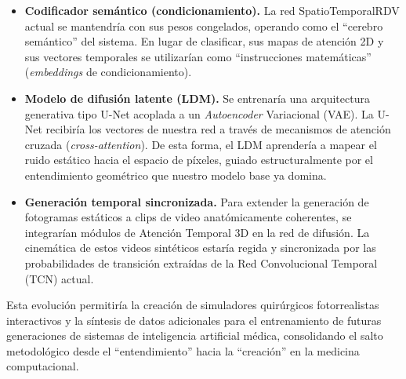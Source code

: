 \documentclass[11pt]{article}
\begin{document}
\begin{itemize}[leftmargin=1.4em]
    \item \textbf{Codificador semántico (condicionamiento).} La red SpatioTemporalRDV actual se mantendría con sus pesos congelados, operando como el ``cerebro semántico'' del sistema. En lugar de clasificar, sus mapas de atención 2D y sus vectores temporales se utilizarían como ``instrucciones matemáticas'' (\emph{embeddings} de condicionamiento).
    \item \textbf{Modelo de difusión latente (LDM).} Se entrenaría una arquitectura generativa tipo U-Net acoplada a un \emph{Autoencoder} Variacional (VAE). La U-Net recibiría los vectores de nuestra red a través de mecanismos de atención cruzada (\emph{cross-attention}). De esta forma, el LDM aprendería a mapear el ruido estático hacia el espacio de píxeles, guiado estructuralmente por el entendimiento geométrico que nuestro modelo base ya domina.
    \item \textbf{Generación temporal sincronizada.} Para extender la generación de fotogramas estáticos a clips de video anatómicamente coherentes, se integrarían módulos de Atención Temporal 3D en la red de difusión. La cinemática de estos videos sintéticos estaría regida y sincronizada por las probabilidades de transición extraídas de la Red Convolucional Temporal (TCN) actual.
\end{itemize}

Esta evolución permitiría la creación de simuladores quirúrgicos fotorrealistas interactivos y la síntesis de datos adicionales para el entrenamiento de futuras generaciones de sistemas de inteligencia artificial médica, consolidando el salto metodológico desde el ``entendimiento'' hacia la ``creación'' en la medicina computacional.
\end{document}

